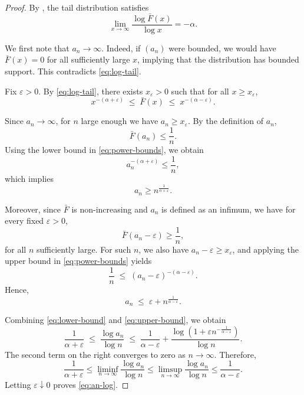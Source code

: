 \documentclass[11pt,reqno]{amsart}
\theoremstyle{definition}
\theoremstyle{remark}
\numberwithin{equation}{section}
\begin{document}
\begin{proof}
By \cite[Proposition~0.8(ii)]{resnick}, the tail distribution satisfies
\begin{equation}\label{eq:log-tail}
\lim_{x\to\infty}\frac{\log \bar F(x)}{\log x} = -\alpha.
\end{equation}

We first note that $a_n\to\infty$. Indeed, if $(a_n)$ were bounded, we would have $\bar F(x)=0$ for all
sufficiently large $x$, implying that the distribution has bounded support.
This contradicts \eqref{eq:log-tail}.

Fix $\varepsilon>0$. By \eqref{eq:log-tail}, there exists $x_\varepsilon>0$ such
that for all $x\ge x_\varepsilon$,
\begin{equation}\label{eq:power-bounds}
x^{-(\alpha+\varepsilon)}
\;\le\;
\bar F(x)
\;\le\;
x^{-(\alpha-\varepsilon)}.
\end{equation}

Since $a_n\to\infty$, for $n$ large enough we have $a_n\ge x_\varepsilon$.
By the definition of $a_n$,
\begin{equation}\label{eq:quantile-def}
\bar F(a_n)\le \frac{1}{n}.
\end{equation}
Using the lower bound in \eqref{eq:power-bounds}, we obtain
\[
a_n^{-(\alpha+\varepsilon)} \le \frac{1}{n},
\]
which implies
\begin{equation}\label{eq:lower-bound}
a_n \ge n^{\frac{1}{\alpha+\varepsilon}}.
\end{equation}

Moreover, since $\bar F$ is non-increasing and $a_n$ is defined as an infimum,
we have for every fixed $\varepsilon>0$,
\begin{equation}\label{eq:before-quantile}
\bar F(a_n-\varepsilon)\ge \frac{1}{n},
\end{equation}
for all $n$ sufficiently large. For such $n$, we also have
$a_n-\varepsilon\ge x_\varepsilon$, and applying the upper bound in
\eqref{eq:power-bounds} yields
\[
\frac{1}{n}
\;\le\;
(a_n-\varepsilon)^{-(\alpha-\varepsilon)}.
\]
Hence,
\begin{equation}\label{eq:upper-bound}
a_n
\;\le\;
\varepsilon + n^{\frac{1}{\alpha-\varepsilon}}.
\end{equation}

Combining \eqref{eq:lower-bound} and \eqref{eq:upper-bound}, we obtain
\[
\frac{1}{\alpha+\varepsilon}
\;\le\;
\frac{\log a_n}{\log n}
\;\le\;
\frac{1}{\alpha-\varepsilon}
+
\frac{\log\!\left(1+\varepsilon n^{-\frac{1}{\alpha-\varepsilon}}\right)}{\log n}.
\]
The second term on the right converges to zero as $n\to\infty$. Therefore,
\[
\frac{1}{\alpha+\varepsilon}
\le
\liminf_{n\to\infty}\frac{\log a_n}{\log n}
\le
\limsup_{n\to\infty}\frac{\log a_n}{\log n}
\le
\frac{1}{\alpha-\varepsilon}.
\]
Letting $\varepsilon\downarrow0$ proves \eqref{eq:an-log}.


\end{proof}
\end{document}
